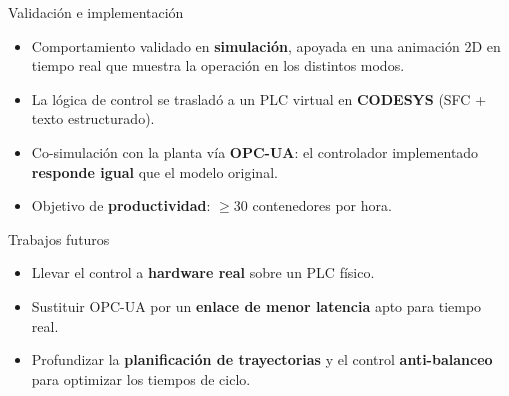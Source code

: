 \begin{frame}{Validación e implementación}
  \begin{itemize}
    \item Comportamiento validado en \textbf{simulación}, apoyada en una animación 2D en tiempo
          real que muestra la operación en los distintos modos.
    \item La lógica de control se trasladó a un PLC virtual en \textbf{CODESYS} (SFC + texto
          estructurado).
    \item Co-simulación con la planta vía \textbf{OPC-UA}: el controlador implementado
          \textbf{responde igual} que el modelo original.
    \item Objetivo de \textbf{productividad}: $\geq 30$ contenedores por hora.
  \end{itemize}
\end{frame}

\begin{frame}{Trabajos futuros}
  \begin{itemize}
    \item Llevar el control a \textbf{hardware real} sobre un PLC físico.
    \item Sustituir OPC-UA por un \textbf{enlace de menor latencia} apto para tiempo real.
    \item Profundizar la \textbf{planificación de trayectorias} y el control \textbf{anti-balanceo}
          para optimizar los tiempos de ciclo.
  \end{itemize}
\end{frame}

